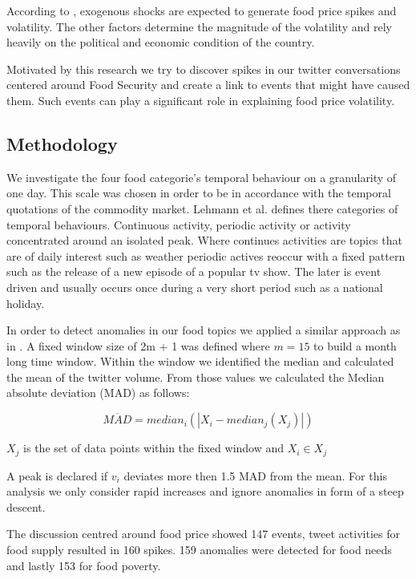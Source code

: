 According to \cite{Tadesse2014} , exogenous shocks are expected to generate food price spikes and volatility. The other factors determine the magnitude of the volatility and rely heavily on the political and economic condition of the country. 

Motivated by this research we try to discover spikes in our twitter conversations centered around Food Security and create a link to events that might have 	caused them. Such events can play a significant role in explaining food price volatility. 


\subsection{Methodology} 

We investigate the four food categorie's temporal behaviour on a granularity of one day. This scale was chosen in order to be in accordance with the temporal quotations of the commodity market. Lehmann et al. \cite{Lehmann2012} defines there categories of temporal behaviours. Continuous activity, periodic activity or activity concentrated around an isolated peak. Where continues activities are topics that are of daily  interest such as weather periodic actives reoccur with a fixed pattern such as the release of a new episode of a popular tv show. The later is event driven and usually occurs once during a very short period such as a national holiday. 

In order to detect anomalies in our food topics we applied a similar approach as in \cite{olt15} \cite{Lehmann2012}. A fixed window size of 2m + 1 was defined where $m = 15$ to build a month long time window. Within the window we identified the median and calculated the mean of the twitter volume. From those values we calculated the Median absolute deviation (MAD) as follows: 

\begin{equation} \label{eq:solve}
\overline{ MAD } = median_i (|X_i - median_j(X_j)|)\end{equation}


$X_j$ is the set of data points within the fixed window and $X_i \in X_j$

A peak is declared if $v_i$ deviates more then 1.5 MAD from the mean. For this analysis we only consider rapid increases and ignore anomalies in form of a steep descent. 

The discussion centred around food price showed 147 events, tweet activities for food supply resulted in 160 spikes. 159 anomalies were detected for food needs and lastly 153 for food poverty. 
 

